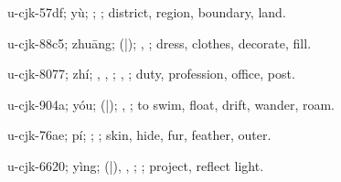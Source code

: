 \begin{multicols}{2}
{\cjkgGlue{}u-cjk-57df; yù; \cjkgGlue{}; \cjkgGlue{}; district, region, boundary, land.

\cjkgGlue{}u-cjk-88c5; zhuāng; \cjkgGlue{}\cjkgGlue{}(\cjkgGlue{}|\cjkgGlue{}); \cjkgGlue{}, \cjkgGlue{}; dress, clothes, decorate, fill.

\cjkgGlue{}u-cjk-8077; zhí; \cjkgGlue{}, \cjkgGlue{}, \cjkgGlue{}; \cjkgGlue{}, \cjkgGlue{}; duty, profession, office, post.

\cjkgGlue{}u-cjk-904a; yóu; \cjkgGlue{}\cjkgGlue{}(\cjkgGlue{}|\cjkgGlue{}); \cjkgGlue{}, \cjkgGlue{}; to swim, float, drift, wander, roam.

\cjkgGlue{}u-cjk-76ae; pí; \cjkgGlue{}; \cjkgGlue{}; skin, hide, fur, feather, outer.

\cjkgGlue{}u-cjk-6620; yìng; \cjkgGlue{}\cjkgGlue{}(\cjkgGlue{}|\cjkgGlue{}), \cjkgGlue{}\cjkgGlue{}\cjkgGlue{}, \cjkgGlue{}\cjkgGlue{}\cjkgGlue{}; \cjkgGlue{}; project, reflect light.

}
\end{multicols}
